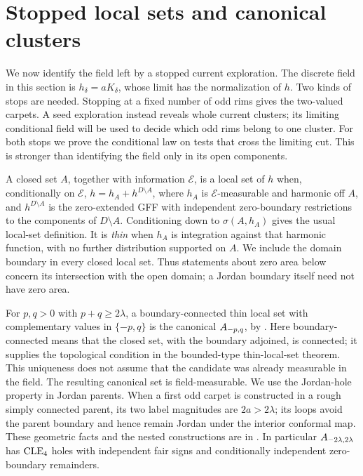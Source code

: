 \section{Stopped local sets and canonical clusters}
\label{sec:local-sets}

We now identify the field left by a stopped current exploration. The
discrete field in this section is \(h_\delta=aK_\delta\), whose limit has
the normalization of \(h\). Two kinds of stops are needed. Stopping at a
fixed number of odd rims gives the two-valued carpets. A seed exploration
instead reveals whole current clusters; its limiting conditional field
will be used to decide which odd rims belong to one cluster. For both
stops we prove the conditional law on tests that cross the limiting cut.
This is stronger than identifying the field only in its open components.

A closed set \(A\), together with information \(\mathscr E\), is a local
set of \(h\) when, conditionally on \(\mathscr E\),
\(h=h_A+h^{D\setminus A}\), where \(h_A\) is
\(\mathscr E\)-measurable and harmonic off \(A\), and
\(h^{D\setminus A}\) is the zero-extended GFF with independent
zero-boundary restrictions to the components of \(D\setminus A\).
Conditioning down to \(\sigma(A,h_A)\) gives the usual local-set definition.
It is \emph{thin} when \(h_A\) is integration against that harmonic
function, with no further distribution supported on \(A\). We include
the domain boundary in every closed local set. Thus statements about
zero area below concern its intersection with the open domain; a Jordan
boundary itself need not have zero area.

For \(p,q>0\) with \(p+q\ge2\lambda\), a boundary-connected thin local
set with complementary values in \(\{-p,q\}\) is the canonical
\(A_{-p,q}\), by \cite[Proposition~2]{ASW2017}. Here
boundary-connected means that the closed set, with the boundary adjoined,
is connected; it supplies the topological condition in the bounded-type
thin-local-set theorem. This uniqueness does not assume that the candidate
was already measurable in the field. The resulting canonical set is
field-measurable. We use the Jordan-hole property in Jordan parents. When
a first odd carpet is constructed in a rough simply connected parent, its
two label magnitudes are \(2a>2\lambda\); its loops avoid the parent
boundary and hence remain Jordan under the interior conformal map.
These geometric facts and the nested constructions are in
\cite[Sections~3--4]{AS2018}. In particular
\(A_{-2\lambda,2\lambda}\) has \(\mathrm{CLE}_4\) holes with independent fair
signs and conditionally independent zero-boundary remainders.

